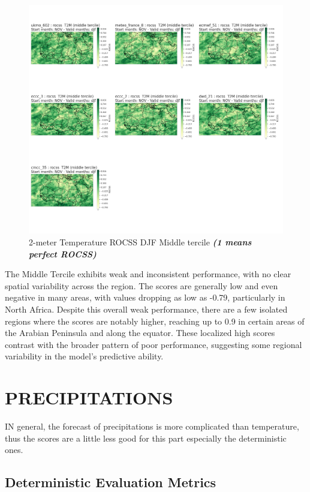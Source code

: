 \begin{figure}[H]
    \centering
    \includegraphics[width=1\linewidth]{plots/prob/rocss/rocss_djf_t2m_middle.png}
    \caption{2-meter Temperature ROCSS DJF Middle tercile \textbf{\textit{(1 means perfect ROCSS)}}}
\end{figure}

The Middle Tercile exhibits weak and inconsistent performance, with no clear spatial variability across the region. The scores are generally low and even negative in many areas, with values dropping as low as -0.79, particularly in North Africa. Despite this overall weak performance, there are a few isolated regions where the scores are notably higher, reaching up to 0.9 in certain areas of the Arabian Peninsula and along the equator. These localized high scores contrast with the broader pattern of poor performance, suggesting some regional variability in the model's predictive ability.

\section{PRECIPITATIONS}
IN general, the forecast of precipitations is more complicated than temperature, thus the scores are a little less good for this part especially the deterministic ones. 
\subsection{Deterministic Evaluation Metrics}

